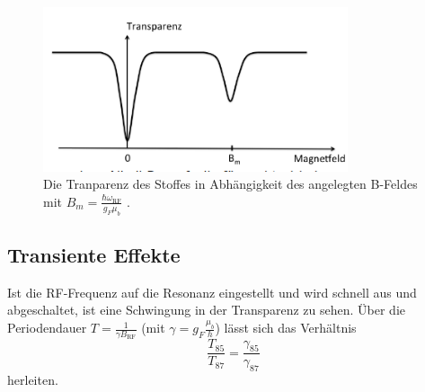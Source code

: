 \begin{figure}
    \centering
    \includegraphics[width=0.80\textwidth]{Fotos/trans.png}
    \caption{Die Tranparenz des Stoffes in Abhängigkeit des angelegten B-Feldes 
    mit $B_m = \frac{\hbar \omega_\text{RF}}{g_F \mu_b }$ \cite{V21}.}
    \label{fig:trans}
\end{figure}

\subsection{Transiente Effekte}
\noindent Ist die RF-Frequenz auf die Resonanz eingestellt 
und wird schnell aus und abgeschaltet,
ist eine Schwingung in der Transparenz zu sehen. 
Über die Periodendauer $T=\frac{1}{\gamma B_\text{RF}}$ 
(mit $\gamma = g_F \frac{\mu_b}{h}$) lässt sich das Verhältnis
\begin{equation}
    \frac{T_85}{T_87} = \frac{\gamma_85}{\gamma_87}
\end{equation}
\noindent herleiten.



